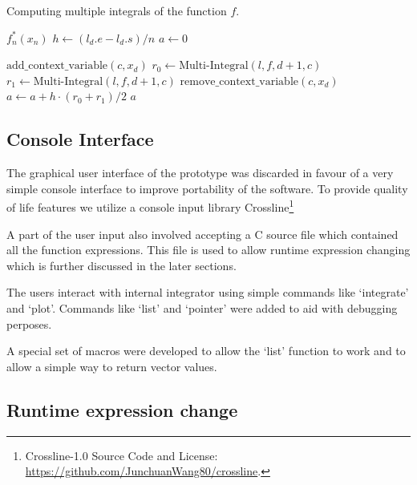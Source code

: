 \documentclass[12pt]{article}
\begin{document}
\begin{algorithm}
	\caption{Computing multiple integrals of the function $f$.}
	\begin{algorithmic}[1]
		\State \Return $f^*_n(x_n)$ 
		\Else
		\State $h \gets (l_d.e - l_d.s) / n$
		\State $a \gets 0$

		\State $\text{add\_context\_variable}\left( c, x_d \right)$
		\State $r_0 \gets \text{Multi-Integral}(l, f, d + 1, c)$
		\State $r_1 \gets \text{Multi-Integral}(l, f, d + 1, c)$
		\State $\text{remove\_context\_variable}\left( c, x_d \right)$
		\State $a \gets a + h \cdot (r_0 + r_1) / 2$
		\EndFor
		\State \Return $a$
		\EndIf
		\EndProcedure
	\end{algorithmic}
\end{algorithm}

\subsection{Console Interface}

The graphical user interface of the prototype was discarded in favour of a very simple console interface to improve portability of
the software. To provide quality of life features we utilize a console input library Crossline\footnote{Crossline-1.0 Source Code and License: \url{https://github.com/JunchuanWang80/crossline}.}

A part of the user input also involved accepting a C source file which contained all the function expressions. This file is used to allow runtime
expression changing which is further discussed in the later sections.

The users interact with internal integrator using simple commands like `integrate' and `plot'. Commands like `list' and `pointer' were added to 
aid with debugging perposes.

A special set of macros were developed to allow the `list' function to work and to allow a simple way to return vector values.

\subsection{Runtime expression change}
\end{document}
